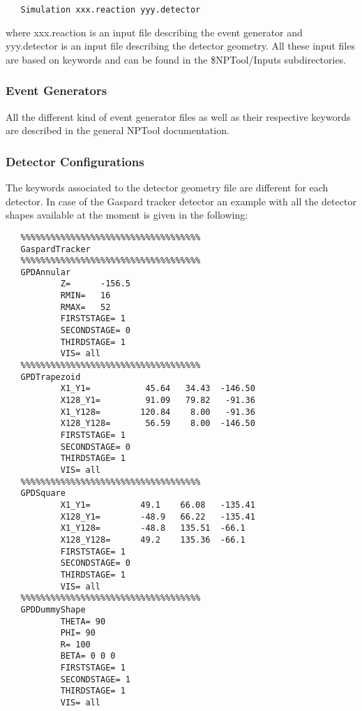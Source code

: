 \documentclass[a4paper,12pt]{article}
\begin{document}
\begin{verbatim}
   Simulation xxx.reaction yyy.detector
\end{verbatim}

where xxx.reaction is an input file describing the event generator and
yyy.detector is an input file describing the detector geometry. All these
input files are based on keywords and can be found in the 
\$NPTool/Inputs subdirectories.

\subsubsection{Event Generators}
All the different kind of event generator files as well as their 
respective keywords are described in the general NPTool documentation. 

\subsubsection{Detector Configurations}
The keywords associated to the detector geometry file are different for 
each detector. In case of the Gaspard tracker detector an example with 
all the detector shapes available at the moment is given in the following:

\begin{verbatim}
   %%%%%%%%%%%%%%%%%%%%%%%%%%%%%%%%%%%%
   GaspardTracker
   %%%%%%%%%%%%%%%%%%%%%%%%%%%%%%%%%%%%
   GPDAnnular
           Z=      -156.5
           RMIN=   16
           RMAX=   52
           FIRSTSTAGE= 1
           SECONDSTAGE= 0
           THIRDSTAGE= 1
           VIS= all
   %%%%%%%%%%%%%%%%%%%%%%%%%%%%%%%%%%%%
   GPDTrapezoid
           X1_Y1=           45.64   34.43  -146.50
           X128_Y1=         91.09   79.82   -91.36
           X1_Y128=        120.84    8.00   -91.36
           X128_Y128=       56.59    8.00  -146.50
           FIRSTSTAGE= 1
           SECONDSTAGE= 0
           THIRDSTAGE= 1
           VIS= all
   %%%%%%%%%%%%%%%%%%%%%%%%%%%%%%%%%%%%
   GPDSquare
           X1_Y1=          49.1    66.08   -135.41
           X128_Y1=        -48.9   66.22   -135.41
           X1_Y128=        -48.8   135.51  -66.1
           X128_Y128=      49.2    135.36  -66.1
           FIRSTSTAGE= 1
           SECONDSTAGE= 0
           THIRDSTAGE= 1
           VIS= all
   %%%%%%%%%%%%%%%%%%%%%%%%%%%%%%%%%%%%
   GPDDummyShape
           THETA= 90
           PHI= 90
           R= 100
           BETA= 0 0 0
           FIRSTSTAGE= 1
           SECONDSTAGE= 1
           THIRDSTAGE= 1
           VIS= all
\end{verbatim}
\end{document}
